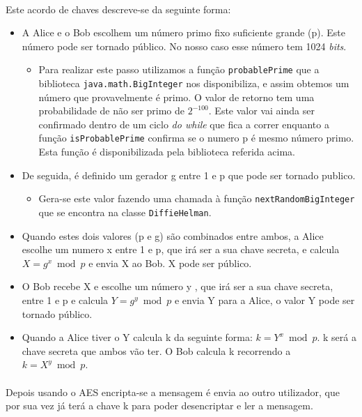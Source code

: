 \paragraph{}
Este acordo de chaves descreve-se da seguinte forma:
\begin{itemize}
    \item A Alice e o Bob escolhem um número primo fixo suficiente grande (p). Este número  pode ser tornado público. No nosso caso esse número tem 1024 \textit{bits}.
    \begin{itemize}
       \item Para realizar este passo utilizamos a função \texttt{probablePrime} que a biblioteca \texttt{java.math.BigInteger} nos disponibiliza, e assim obtemos um número que provavelmente é primo. O valor de retorno tem uma probabilidade de não ser primo de $2^{-100}$. Este valor vai ainda ser confirmado dentro de um ciclo \codigo\textit{{do while}} que fica a correr enquanto a função \texttt{isProbablePrime} confirma se o numero p é mesmo número primo. Esta função é disponibilizada pela biblioteca referida acima.
    \end{itemize}
    \item De seguida, é definido um gerador g entre 1 e p que pode ser tornado publico.
       \begin{itemize}
           \item Gera-se este valor fazendo uma chamada à função \texttt{nextRandomBigInteger} que se encontra na classe \texttt{DiffieHelman}.
       \end{itemize}
    \item Quando estes dois valores (p e g) são combinados entre ambos, a Alice escolhe um numero x entre 1 e p, que irá ser a sua chave secreta, e calcula $X=g^x \bmod p$ e envia X ao Bob. X pode ser público.
    \item O Bob recebe X e  escolhe um número y , que irá ser a sua chave secreta, entre 1 e p e calcula $Y=g^y \bmod p$ e envia Y para a Alice, o valor Y pode ser tornado público.
    \item Quando a Alice tiver o Y calcula k da seguinte forma: $k= Y^x \bmod p$. k será a chave secreta que ambos vão ter. O Bob calcula k recorrendo a $k=X^y\bmod p$.
\end{itemize}
\paragraph{}
Depois usando o AES encripta-se a mensagem é envia ao outro utilizador, que por sua vez já terá a chave k para poder desencriptar e ler a mensagem.

